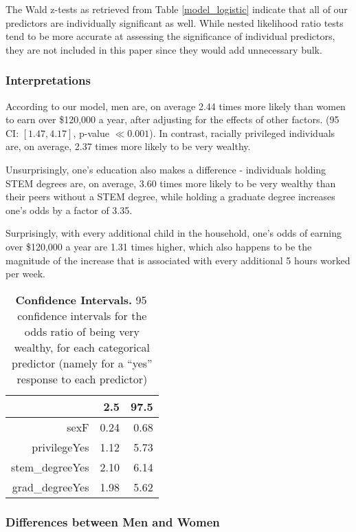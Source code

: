 \documentclass{article}
\newcommand*\pct{\scalebox{.85}{\%}}
\begin{document}
The Wald z-tests as retrieved from Table \ref{model_logistic} indicate that all of our predictors are individually significant as well. While nested likelihood ratio tests tend to be more accurate at assessing the significance of individual predictors, they are not included in this paper since they would add unnecessary bulk.

\subsubsection{Interpretations}

According to our model, men are, on average 2.44 times more likely than women to earn over \$120,000 a year, after adjusting for the effects of other factors. (95\pct \, CI: $\left[1.47, 4.17\right]$, p-value $\ll 0.001$). In contrast, racially privileged individuals are, on average, 2.37 times more likely to be very wealthy.

Unsurprisingly, one's education also makes a difference - individuals holding STEM degrees are, on average, 3.60 times more likely to be very wealthy than their peers without a STEM degree, while holding a graduate degree increases one's odds by a factor of 3.35.

Surprisingly, with every additional child in the household, one's odds of earning over \$120,000 a year are 1.31 times higher, which also happens to be the magnitude of the increase that is associated with every additional 5 hours worked per week.

\begin{table}[ht]
\centering
\begin{tabular}{rrr}
  \toprule
  & 2.5\pct & 97.5\pct \\ 
  \midrule
  sexF & 0.24 & 0.68 \\ 
  privilegeYes & 1.12 & 5.73 \\ 
  stem\_degreeYes & 2.10 & 6.14 \\ 
  grad\_degreeYes & 1.98 & 5.62 \\ 
  \bottomrule
\end{tabular}
\caption{\textbf{Confidence Intervals.} 95\pct \, confidence intervals for the odds ratio of being very wealthy, for each categorical predictor (namely for a ``yes'' response to each predictor)}
\label{confint_logistic}
\end{table}

\subsubsection{Differences between Men and Women}
\end{document}
